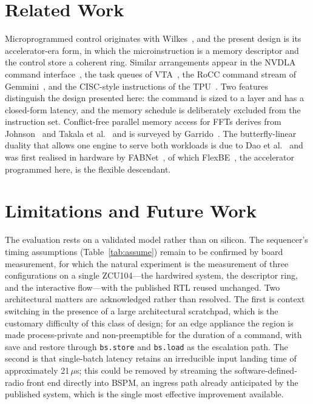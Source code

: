 \documentclass[twocolumn,10pt]{article}
\newcommand{\op}[1]{\texttt{#1}}
\begin{document}
\section{Related Work}
Microprogrammed control originates with Wilkes~\cite{wilkes1953}, and the
present design is its accelerator-era form, in which the microinstruction is a
memory descriptor and the control store a coherent ring.  Similar arrangements
appear in the NVDLA command interface~\cite{nvdla}, the task queues of
VTA~\cite{vta}, the RoCC command stream of Gemmini~\cite{gemmini}, and the
CISC-style instructions of the TPU~\cite{tpu}.  Two features distinguish the
design presented here: the command is sized to a layer and has a closed-form
latency, and the memory schedule is deliberately excluded from the instruction
set.  Conflict-free parallel memory access for FFTs derives from
Johnson~\cite{johnson1992} and Takala et al.~\cite{takala2003} and is surveyed
by Garrido~\cite{garrido2022}.  The butterfly-linear duality that allows one
engine to serve both workloads is due to Dao et al.~\cite{dao2019butterfly} and
was first realised in hardware by FABNet~\cite{fan2022fabnet}, of which
FlexBE~\cite{flexbe}, the accelerator programmed here, is the flexible
descendant.

\section{Limitations and Future Work}
The evaluation rests on a validated model rather than on silicon.  The
sequencer's timing assumptions (Table~\ref{tab:assume}) remain to be confirmed
by board measurement, for which the natural experiment is the measurement of
three configurations on a single ZCU104---the hardwired system, the descriptor
ring, and the interactive flow---with the published RTL reused unchanged.  Two
architectural matters are acknowledged rather than resolved.  The first is
context switching in the presence of a large architectural scratchpad, which is
the customary difficulty of this class of design; for an edge appliance the
region is made process-private and non-preemptible for the duration of a
command, with save and restore through \op{bs.store} and \op{bs.load} as the
escalation path.  The second is that single-batch latency retains an irreducible
input landing time of approximately 21\,$\mu$s; this could be removed by
streaming the software-defined-radio front end directly into BSPM, an ingress
path already anticipated by the published system, which is the single most
effective improvement available.
\end{document}
